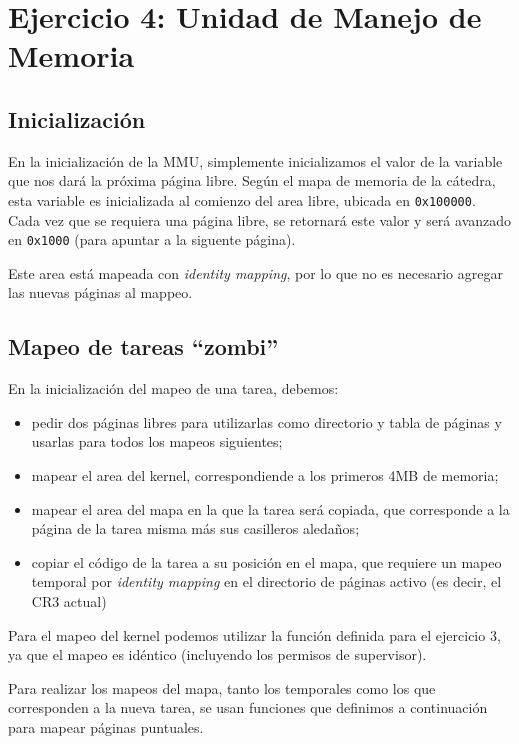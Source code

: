 \section{Ejercicio 4: Unidad de Manejo de Memoria}

	\subsection{Inicialización}

	En la inicialización de la MMU, simplemente inicializamos el valor de la variable que nos dará la próxima página libre. Según el mapa de memoria de la cátedra, esta variable es inicializada al comienzo del area libre, ubicada en \texttt{0x100000}. Cada vez que se requiera una página libre, se retornará este valor y será avanzado en \texttt{0x1000} (para apuntar a la siguente página).

	Este area está mapeada con \textit{identity mapping}, por lo que no es necesario agregar las nuevas páginas al mappeo.

	\subsection{Mapeo de tareas ``zombi''}

	En la inicialización del mapeo de una tarea, debemos: 

	\begin{itemize}
		\item pedir dos páginas libres para utilizarlas como directorio y tabla de páginas y usarlas para todos los mapeos siguientes;

		\item mapear el area del kernel, correspondiende a los primeros 4MB de memoria;

		\item mapear el area del mapa en la que la tarea será copiada, que corresponde a la página de la tarea misma más sus casilleros aledaños;

		\item copiar el código de la tarea a su posición en el mapa, que requiere un mapeo temporal por \textit{identity mapping} en el directorio de páginas activo (es decir, el CR3 actual)
	\end{itemize}

	Para el mapeo del kernel podemos utilizar la función definida para el ejercicio 3, ya que el mapeo es idéntico (incluyendo los permisos de supervisor).

	Para realizar los mapeos del mapa, tanto los temporales como los que corresponden a la nueva tarea, se usan funciones que definimos a continuación para mapear páginas puntuales.

